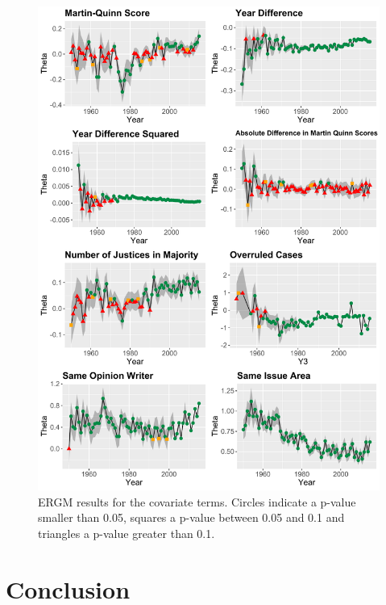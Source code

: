 \documentclass[headsepline=true, abstracton]{scrartcl}
\begin{document}
 \begin{figure}[H]
\includegraphics[width=16cm]{SCC_Results_2}
\caption{ERGM results for the covariate terms. Circles indicate a p-value smaller than 0.05, squares a p-value between 0.05 and 0.1 and triangles a p-value greater than 0.1.}
 \label{SCC_results_2}
\vspace{-.25cm}
\end{figure} 




\section{Conclusion}
\end{document}

